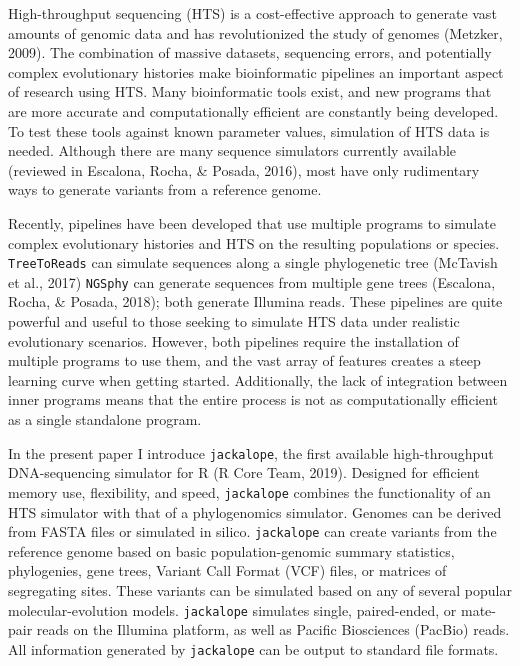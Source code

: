 \documentclass[12pt,]{article}
\begin{document}
High-throughput sequencing (HTS) is a cost-effective approach to generate vast amounts
of genomic data and has revolutionized the study of genomes
(Metzker, 2009).
The combination of massive datasets, sequencing errors, and potentially complex
evolutionary histories make bioinformatic pipelines an important aspect of
research using HTS.
Many bioinformatic tools exist, and new programs that are more accurate and
computationally efficient are constantly being developed.
To test these tools against known parameter values, simulation of HTS data is needed.
Although there are many sequence simulators currently available
(reviewed in Escalona, Rocha, \& Posada, 2016),
most have only rudimentary ways to generate variants from a reference genome.

Recently, pipelines have been developed that use multiple programs
to simulate complex evolutionary histories and HTS on the resulting populations
or species.
\texttt{TreeToReads} can simulate sequences along a single phylogenetic tree
(McTavish et al., 2017)
\texttt{NGSphy} can generate sequences from multiple gene trees
(Escalona, Rocha, \& Posada, 2018);
both generate Illumina reads.
These pipelines are quite powerful and useful to those seeking to simulate
HTS data under realistic evolutionary scenarios.
However, both pipelines require the installation of multiple programs to use them,
and the vast array of features creates a steep learning curve when getting started.
Additionally, the lack of integration between inner programs means that the
entire process is not as computationally efficient as a single standalone program.

In the present paper I introduce \texttt{jackalope}, the first available high-throughput
DNA-sequencing simulator for R
(R Core Team, 2019).
Designed for efficient memory use, flexibility, and speed,
\texttt{jackalope} combines the functionality of an HTS simulator with that of a
phylogenomics simulator.
Genomes can be derived from FASTA files or simulated in silico.
\texttt{jackalope} can create variants from the reference genome based on basic
population-genomic summary statistics, phylogenies, gene trees,
Variant Call Format (VCF) files, or matrices of segregating sites.
These variants can be simulated based on any of several popular
molecular-evolution models.
\texttt{jackalope} simulates single, paired-ended, or mate-pair reads on the Illumina platform,
as well as Pacific Biosciences (PacBio) reads.
All information generated by \texttt{jackalope} can be output to standard file formats.
\end{document}
